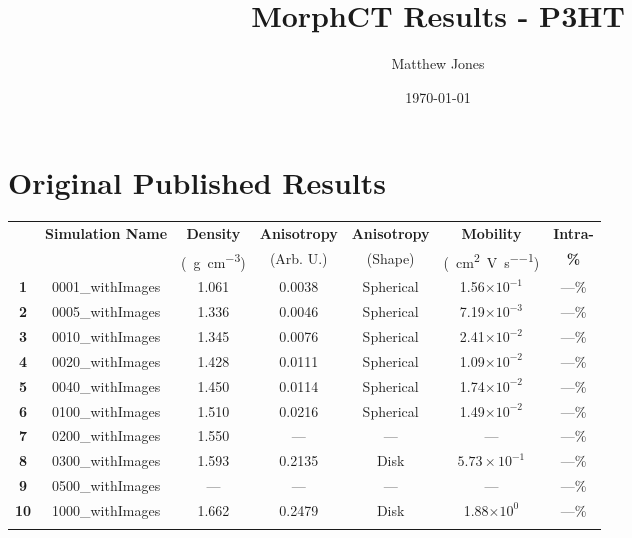 \documentclass[12pt]{article}
\title{MorphCT Results - P3HT}
\author{Matthew Jones}
\date{\today}
\def\mobunits{\square\centi\meter\per\volt\per\second}
\def\gcm{\gram\per\cubic\centi\meter}
\def\ccg{\cellcolor{gray}}
\begin{document}
\maketitle

\section{Original Published Results}

\begin{center}
\begin{tabular}{| c | c | c | c | c | c | c |}
\hline
\rule{0pt}{2.5ex} 
\multirow{2}{*}{\textbf{ID}}&\multirow{2}{*}{\textbf{Simulation Name}}&\textbf{Density}&\textbf{Anisotropy}&\textbf{Anisotropy}&\textbf{Mobility}&\textbf{Intra-}\\
                            &&(\SI{}{\gcm})&(Arb. U.)&(Shape)&(\SI{}{\mobunits})&\textbf{\%}\\
\hhline{|=======|}
\textbf{\ccg1}&\rule{0pt}{2.5ex}\ccg 0001\_withImages&\ccg 1.061&\ccg 0.0038&\ccg Spherical&\ccg1.56$\times 10^{-1}$&\ccg---\%\\
\textbf{2}&\rule{0pt}{2.5ex}0005\_withImages&1.336&0.0046&Spherical&7.19$\times 10^{-3}$&---\%\\
\textbf{\ccg3}&\rule{0pt}{2.5ex}\ccg 0010\_withImages&\ccg 1.345&\ccg 0.0076&\ccg Spherical&\ccg2.41$\times 10^{-2}$&\ccg---\%\\
\textbf{4}&\rule{0pt}{2.5ex}0020\_withImages&1.428&0.0111&Spherical&1.09$\times 10^{-2}$&---\%\\
\textbf{\ccg5}&\rule{0pt}{2.5ex}\ccg 0040\_withImages&\ccg 1.450&\ccg 0.0114&\ccg Spherical&\ccg1.74$\times 10^{-2}$&\ccg---\%\\
\textbf{6}&\rule{0pt}{2.5ex}0100\_withImages&1.510&0.0216&Spherical&1.49$\times 10^{-2}$&---\%\\
\textbf{\ccg7}&\rule{0pt}{2.5ex}\ccg 0200\_withImages&\ccg 1.550&\ccg ---&\ccg ---&\ccg---&\ccg---\%\\
\textbf{8}&\rule{0pt}{2.5ex}0300\_withImages&1.593&0.2135&Disk&$5.73\times 10^{-1}$&---\%\\
\textbf{\ccg9}&\rule{0pt}{2.5ex}\ccg 0500\_withImages&\ccg ---&\ccg ---&\ccg ---&\ccg---&\ccg---\%\\
\textbf{10}&\rule{0pt}{2.5ex}1000\_withImages&1.662&0.2479&Disk&1.88$\times 10^{0}$&---\%\\
\hhline{-------}
\end{tabular}\label{table:mob}
\end{center}
\end{document}
